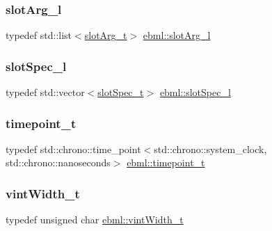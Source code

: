 \mbox{\label{namespaceebml_ae432575dfbb3e141ce897442794f0ca5}} 
\subsubsection{\texorpdfstring{slot\+Arg\+\_\+l}{slotArg\_l}}
{\footnotesize\ttfamily typedef std\+::list$<$\mbox{\hyperlink{classebml_1_1slotArg__t}{slot\+Arg\+\_\+t}}$>$ \mbox{\hyperlink{namespaceebml_ae432575dfbb3e141ce897442794f0ca5}{ebml\+::slot\+Arg\+\_\+l}}}

\mbox{\label{namespaceebml_abdc1248164e4e424423defac9fff7d4d}} 
\subsubsection{\texorpdfstring{slot\+Spec\+\_\+l}{slotSpec\_l}}
{\footnotesize\ttfamily typedef std\+::vector$<$\mbox{\hyperlink{classebml_1_1slotSpec__t}{slot\+Spec\+\_\+t}}$>$ \mbox{\hyperlink{namespaceebml_abdc1248164e4e424423defac9fff7d4d}{ebml\+::slot\+Spec\+\_\+l}}}

\mbox{\label{namespaceebml_a7e667ec3fe8b51fb5b8f9690734d8638}} 
\subsubsection{\texorpdfstring{timepoint\+\_\+t}{timepoint\_t}}
{\footnotesize\ttfamily typedef std\+::chrono\+::time\+\_\+point$<$std\+::chrono\+::system\+\_\+clock, std\+::chrono\+::nanoseconds$>$ \mbox{\hyperlink{namespaceebml_a7e667ec3fe8b51fb5b8f9690734d8638}{ebml\+::timepoint\+\_\+t}}}

\mbox{\label{namespaceebml_a2ccdfb60b23efb51fe07f9d066e23604}} 
\subsubsection{\texorpdfstring{vint\+Width\+\_\+t}{vintWidth\_t}}
{\footnotesize\ttfamily typedef unsigned char \mbox{\hyperlink{namespaceebml_a2ccdfb60b23efb51fe07f9d066e23604}{ebml\+::vint\+Width\+\_\+t}}}



